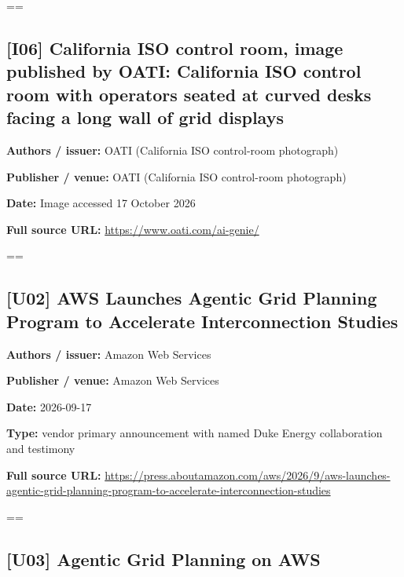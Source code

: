\documentclass[10pt,letterpaper]{article}
\begin{document}
\setbox\readingEntry=\vbox\bgroup\hsize=\linewidth\subsection*{[I06] California ISO control room, image published by OATI: California ISO control room with operators seated at curved desks facing a long wall of grid displays}
\textbf{Authors / issuer:} OATI (California ISO control-room photograph)\par
\textbf{Publisher / venue:} OATI (California ISO control-room photograph)\par
\textbf{Date:} Image accessed 17 October 2026\par
\textbf{Full source URL:} \href{https://www.oati.com/ai-genie/}{\small\ttfamily https:/\allowbreak{}/\allowbreak{}www.\allowbreak{}oati.\allowbreak{}com/\allowbreak{}ai-\allowbreak{}genie/\allowbreak{}}\par
\egroup\par\noindent\box\readingEntry\par\medskip
\setbox\readingEntry=\vbox\bgroup\hsize=\linewidth\subsection*{[U02] AWS Launches Agentic Grid Planning Program to Accelerate Interconnection Studies}
\textbf{Authors / issuer:} Amazon Web Services\par
\textbf{Publisher / venue:} Amazon Web Services\par
\textbf{Date:} 2026-09-17\par
\textbf{Type:} vendor primary announcement with named Duke Energy collaboration and testimony\par
\textbf{Full source URL:} \href{https://press.aboutamazon.com/aws/2026/9/aws-launches-agentic-grid-planning-program-to-accelerate-interconnection-studies}{\small\ttfamily https:/\allowbreak{}/\allowbreak{}press.\allowbreak{}aboutamazon.\allowbreak{}com/\allowbreak{}aws/\allowbreak{}2026/\allowbreak{}9/\allowbreak{}aws-\allowbreak{}launches-\allowbreak{}agentic-\allowbreak{}grid-\allowbreak{}planning-\allowbreak{}program-\allowbreak{}to-\allowbreak{}accelerate-\allowbreak{}interconnection-\allowbreak{}studies}\par
\egroup\par\noindent\box\readingEntry\par\medskip
\setbox\readingEntry=\vbox\bgroup\hsize=\linewidth\subsection*{[U03] Agentic Grid Planning on AWS}
\end{document}
